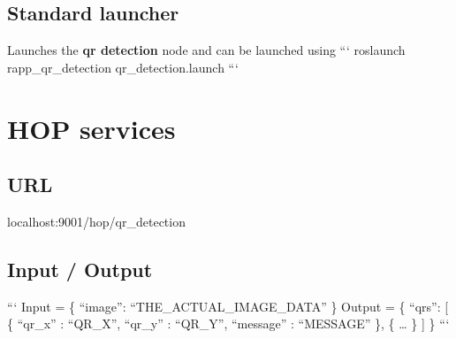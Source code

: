 \subsection*{Standard launcher}

Launches the {\bfseries qr detection} node and can be launched using ``` roslaunch rapp\-\_\-qr\-\_\-detection qr\-\_\-detection.\-launch ```

\section*{H\-O\-P services}

\subsection*{U\-R\-L}

{\ttfamily localhost\-:9001/hop/qr\-\_\-detection}

\subsection*{Input / Output}

``` Input = \{ “image”\-: “\-T\-H\-E\-\_\-\-A\-C\-T\-U\-A\-L\-\_\-\-I\-M\-A\-G\-E\-\_\-\-D\-A\-T\-A” \} {\ttfamily  } Output = \{ “qrs”\-: \mbox{[} \{ “qr\-\_\-x” \-: “\-Q\-R\-\_\-\-X”, “qr\-\_\-y” \-: “\-Q\-R\-\_\-\-Y”, “message” \-: “\-M\-E\-S\-S\-A\-G\-E” \}, \{ … \} \mbox{]} \} ``` 